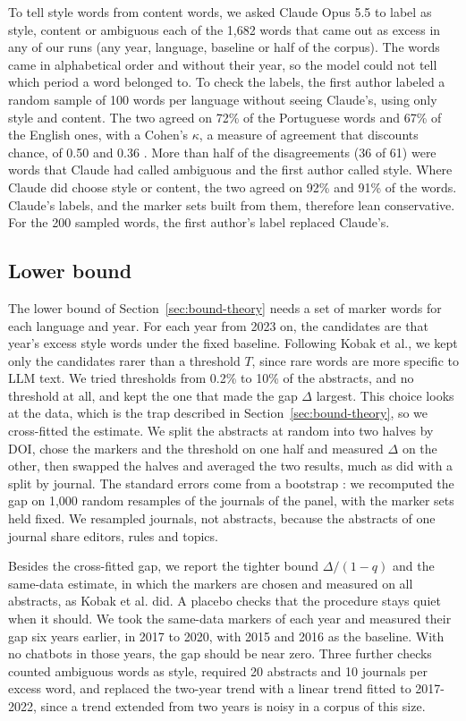 \documentclass[12pt]{article}
\begin{document}
To tell style words from content words, we asked Claude Opus 5.5 to label as style, content or
ambiguous each of the 1,682 words that came out as excess in any of our runs (any year, language,
baseline or half of the corpus). The words came in alphabetical order and without their year, so
the model could not tell which period a word belonged to. To check the labels, the first author
labeled a random sample of 100 words per language without seeing Claude's, using only style and
content. The two agreed on 72\% of the Portuguese words and 67\% of the English ones, with a Cohen's
$\kappa$, a measure of agreement that discounts chance, of 0.50 and 0.36
\cite{cohen1960coefficient}. More than half of the disagreements (36 of 61) were words that Claude
had called ambiguous and the first author called style. Where Claude did choose style or content,
the two agreed on 92\% and 91\% of the words. Claude's labels, and the marker sets built from them,
therefore lean conservative. For the 200 sampled words, the first author's label replaced Claude's.

\subsection{Lower bound}
\label{sec:bound-method}

The lower bound of Section~\ref{sec:bound-theory} needs a set of marker words for each language and
year. For each year from 2023 on, the candidates are that year's excess style words under the fixed
baseline. Following Kobak et al., we kept only the candidates rarer than a threshold $T$, since rare
words are more specific to LLM text. We tried thresholds from 0.2\% to 10\% of the abstracts, and no
threshold at all, and kept the one that made the gap $\Delta$ largest. This choice looks at the
data, which is the trap described in Section~\ref{sec:bound-theory}, so we cross-fitted the
estimate. We split the abstracts at random into two halves by DOI, chose the markers and the
threshold on one half and measured $\Delta$ on the other, then swapped the halves and averaged the
two results, much as \cite{lee2026korean} did with a split by journal. The standard errors come
from a bootstrap \cite{efron1979bootstrap}: we recomputed the gap on 1,000 random resamples of the
journals of the panel, with the marker sets held fixed. We resampled journals, not abstracts,
because the abstracts of one journal share editors, rules and topics.

Besides the cross-fitted gap, we report the tighter bound $\Delta/(1-q)$ and the same-data estimate,
in which the markers are chosen and measured on all abstracts, as Kobak et al. did. A placebo checks
that the procedure stays quiet when it should. We took the same-data markers of each year and
measured their gap six years earlier, in 2017 to 2020, with 2015 and 2016 as the baseline. With no
chatbots in those years, the gap should be near zero. Three
further checks counted ambiguous words as style, required 20 abstracts and 10 journals per excess
word, and replaced the two-year trend with a linear trend fitted to 2017-2022, since a trend
extended from two years is noisy in a corpus of this size.
\end{document}
